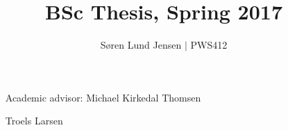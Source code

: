 \documentclass[a4paper]{article}
\title{BSc Thesis, Spring 2017\\
\tbf{Assisting Fuzzing with Concolic Execution}}
\author{Søren Lund Jensen $|$ PWS412}
\newenvironment{bottompar}{\par\vspace*{\fill}}{\clearpage}
\begin{document}

\begin{bottompar}
	\begin{itemize}[noitemsep]
	   \item[Academic advisor:] Michael Kirkedal Thomsen
	                   \item[ ] Troels Larsen
	\end{itemize}
\end{bottompar}

\newpage


\maketitle
\end{document}
